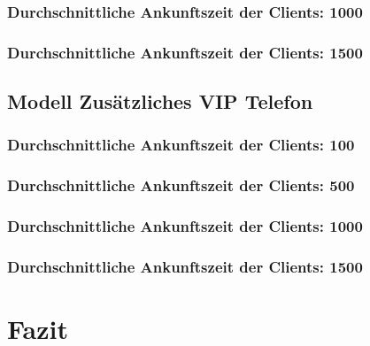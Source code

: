 \subsubsection{Durchschnittliche Ankunftszeit der Clients: 1000}
\subsubsection{Durchschnittliche Ankunftszeit der Clients: 1500}

\subsection{Modell \glqq Zusätzliches VIP Telefon\grqq} 
\subsubsection{Durchschnittliche Ankunftszeit der Clients: 100}
\subsubsection{Durchschnittliche Ankunftszeit der Clients: 500}
\subsubsection{Durchschnittliche Ankunftszeit der Clients: 1000}
\subsubsection{Durchschnittliche Ankunftszeit der Clients: 1500}

\section{Fazit}


